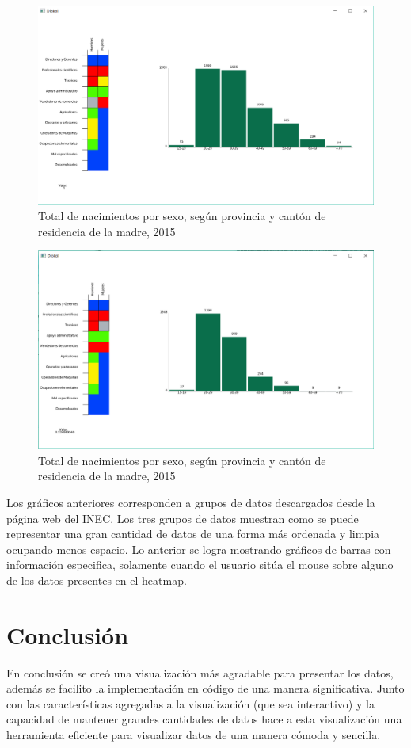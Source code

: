 \documentclass{article}
\begin{document}
\begin{figure}[h!]
\centering
\includegraphics[scale=0.2]{5.png}
\caption{Total de nacimientos por sexo, según provincia y cantón de residencia de la madre, 2015}
\label{fig:Captura 6}
\end{figure}


\begin{figure}[h!]
\centering
\includegraphics[scale=0.2]{6.png}
\caption{Total de nacimientos por sexo, según provincia y cantón de residencia de la madre, 2015}
\label{fig:Captura 7}
\end{figure}

\newpage
Los gráficos anteriores corresponden a grupos de datos descargados desde la página web del INEC. Los tres grupos de datos muestran como se puede representar una gran cantidad de datos de una forma más ordenada y limpia ocupando menos espacio. Lo anterior se logra mostrando gráficos de barras con información especifica, solamente cuando el usuario sitúa el mouse sobre alguno de los datos presentes en el heatmap.

\newpage

\section{Conclusión}

En conclusión se creó una visualización más agradable para presentar los datos, además se facilito la implementación en código de una manera significativa. Junto con las características agregadas a la visualización (que sea interactivo) y la capacidad de mantener grandes cantidades de datos hace a esta visualización una herramienta eficiente para visualizar datos de una manera cómoda y sencilla.



\end{document}
